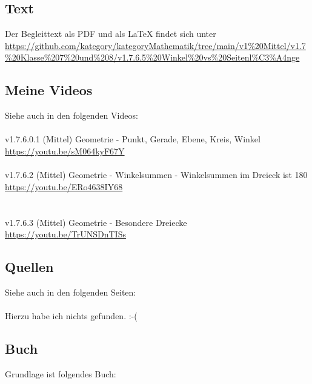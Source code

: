 \documentclass[a4paper]{amsart}
\theoremstyle{definition}
\begin{document}
\subsection*{Text}
Der Begleittext als PDF und als LaTeX findet sich unter
{\tiny
   \url{https://github.com/kategory/kategoryMathematik/tree/main/v1%20Mittel/v1.7%20Klasse%207%20und%208/v1.7.6.5%20Winkel%20vs%20Seitenl%C3%A4nge}
}

\subsection*{Meine Videos}
Siehe auch in den folgenden Videos:\\
\\
v1.7.6.0.1 (Mittel) Geometrie - Punkt, Gerade, Ebene, Kreis, Winkel\\
\url{https://youtu.be/sM064kyF67Y}\\
\\
v1.7.6.2 (Mittel) Geometrie - Winkelsummen - Winkelsummen im Dreieck ist 180\\
\url{https://youtu.be/ERo4638IY68}\\
\\
\\v1.7.6.3 (Mittel) Geometrie - Besondere Dreiecke
\url{https://youtu.be/TrUNSDnTISs}

\subsection*{Quellen}
Siehe auch in den folgenden Seiten:\\
\\
Hierzu habe ich nichts gefunden. :-(

\subsection*{Buch}
Grundlage ist folgendes Buch:\\
\end{document}
